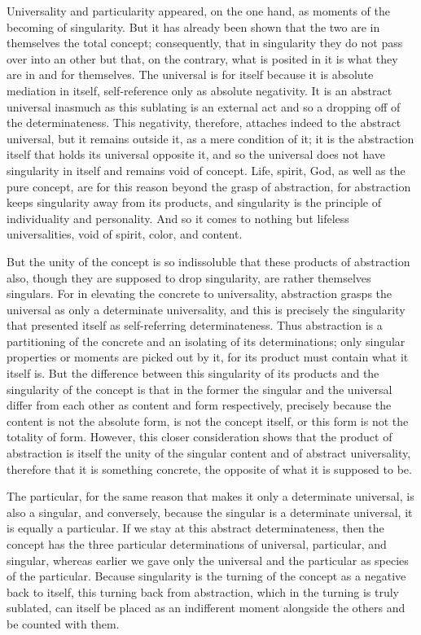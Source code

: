 Universality and particularity appeared, on the one hand,
as moments of the becoming of singularity.
But it has already been shown that the two are
in themselves the total concept;
consequently, that in singularity they do
not pass over into an other
but that, on the contrary,
what is posited in it is
what they are in and for themselves.
The universal is for itself because it
is absolute mediation in itself,
self-reference only as absolute negativity.
It is an abstract universal
inasmuch as this sublating is an external act
and so a dropping off of the determinateness.
This negativity, therefore, attaches indeed
to the abstract universal,
but it remains outside it,
as a mere condition of it;
it is the abstraction itself
that holds its universal opposite it,
and so the universal does not
have singularity in itself
and remains void of concept.
Life, spirit, God, as well as the pure concept,
are for this reason beyond the grasp of abstraction,
for abstraction keeps singularity away from its products,
and singularity is the principle of
individuality and personality.
And so it comes to nothing but lifeless universalities,
void of spirit, color, and content.

But the unity of the concept is so indissoluble
that these products of abstraction also,
though they are supposed to drop singularity,
are rather themselves singulars.
For in elevating the concrete to universality,
abstraction grasps the universal
as only a determinate universality,
and this is precisely the singularity
that presented itself as self-referring determinateness.
Thus abstraction is a partitioning of the concrete
and an isolating of its determinations;
only singular properties or moments are picked out by it,
for its product must contain what it itself is.
But the difference between this
singularity of its products
and the singularity of the concept is
that in the former the singular and the universal differ
from each other as content and form respectively,
precisely because the content is not the absolute form,
is not the concept itself,
or this form is not the totality of form.
However, this closer consideration shows
that the product of abstraction is
itself the unity of the singular content
and of abstract universality,
therefore that it is something concrete,
the opposite of what it is supposed to be.

The particular, for the same reason that
makes it only a determinate universal,
is also a singular, and conversely,
because the singular is a determinate universal,
it is equally a particular.
If we stay at this abstract determinateness,
then the concept has the
three particular determinations of
universal, particular, and singular,
whereas earlier we gave only
the universal and the particular as
species of the particular.
Because singularity is the turning of
the concept as a negative back to itself,
this turning back from abstraction,
which in the turning is truly sublated,
can itself be placed as an indifferent
moment alongside the others
and be counted with them.

